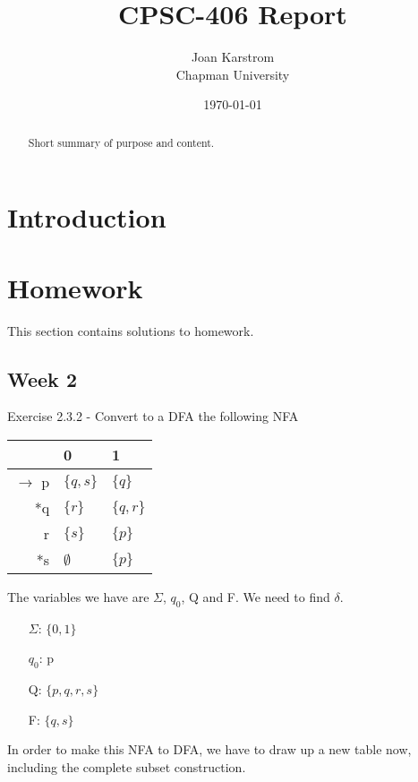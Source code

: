 \documentclass{article}
\title{CPSC-406 Report}
\author{Joan Karstrom \\ Chapman University}
\date{\today}
\theoremstyle{theorem}
\theoremstyle{definition}
\theoremstyle{remark}
\begin{document}
\maketitle

\begin{abstract}
Short  summary of purpose and content.
\end{abstract}

\tableofcontents

\section{Introduction}\label{intro}

\section{Homework}\label{homework}

This section contains solutions to homework.

\subsection{Week 2}

Exercise 2.3.2 - Convert to a DFA the following NFA

\begin{table}[h!] %
\centering
\begin{tabular}{r||l|l}
    & 0 & 1 \\
    \hline
    $\rightarrow$ p & $\{q,s\}$ & $\{q\}$ \\
    *q & $\{r\}$ & $\{q,r\}$ \\
    r & $\{s\}$ & $\{p\}$ \\
    *s & $\emptyset$ & $\{p\}$
\end{tabular}
\end{table}

The variables we have are $\Sigma$, $q_0$, Q and F. We need to find $\delta$.
\begin{enumerate}
    \item[$\Sigma$:] $\{0,1\}$
    \item[$q_0$:] p
    \item[Q:] $\{p,q,r,s\}$
    \item[F:] $\{q,s\}$
\end{enumerate}

In order to make this NFA to DFA, we have to draw up a new table now, including the complete subset construction.
\end{document}
